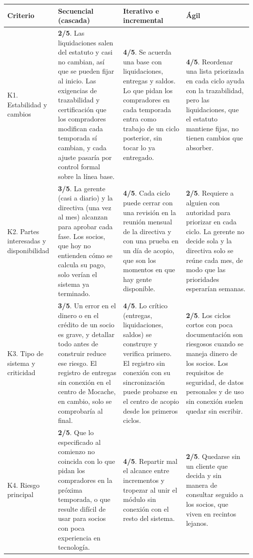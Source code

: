 \documentclass[11pt,a4paper]{article}
\begin{document}
	\small
	\begin{tabularx}{\textwidth}{|p{2.2cm}|Y|Y|Y|}
		\hline
		\textbf{Criterio} &
		\textbf{Secuencial (cascada)} &
		\textbf{Iterativo e incremental} &
		\textbf{Ágil} \\ \hline
		
		K1. Estabilidad y cambios &
		\textbf{2/5}. Las liquidaciones salen del estatuto y casi no cambian, así que se pueden fijar al inicio. Las exigencias de trazabilidad y certificación que los compradores modifican cada temporada sí cambian, y cada ajuste pasaría por control formal sobre la línea base. &
		\textbf{4/5}. Se acuerda una base con liquidaciones, entregas y saldos. Lo que pidan los compradores en cada temporada entra como trabajo de un ciclo posterior, sin tocar lo ya entregado. &
		\textbf{4/5}. Reordenar una lista priorizada en cada ciclo ayuda con la trazabilidad, pero las liquidaciones, que el estatuto mantiene fijas, no tienen cambios que absorber. \\ \hline
		
		K2. Partes interesadas y disponibilidad &
		\textbf{3/5}. La gerente (casi a diario) y la directiva (una vez al mes) alcanzan para aprobar cada fase. Los socios, que hoy no entienden cómo se calcula su pago, solo verían el sistema ya terminado. &
		\textbf{4/5}. Cada ciclo puede cerrar con una revisión en la reunión mensual de la directiva y con una prueba en un día de acopio, que son los momentos en que hay gente disponible. &
		\textbf{2/5}. Requiere a alguien con autoridad para priorizar en cada ciclo. La gerente no decide sola y la directiva solo se reúne cada mes, de modo que las prioridades esperarían semanas. \\ \hline
		
		K3. Tipo de sistema y criticidad &
		\textbf{3/5}. Un error en el dinero o en el crédito de un socio es grave, y detallar todo antes de construir reduce ese riesgo. El registro de entregas sin conexión en el centro de Mocache, en cambio, solo se comprobaría al final. &
		\textbf{4/5}. Lo crítico (entregas, liquidaciones, saldos) se construye y verifica primero. El registro sin conexión con su sincronización puede probarse en el centro de acopio desde los primeros ciclos. &
		\textbf{2/5}. Los ciclos cortos con poca documentación son riesgosos cuando se maneja dinero de los socios. Los requisitos de seguridad, de datos personales y de uso sin conexión suelen quedar sin escribir. \\ \hline
		
		K4. Riesgo principal &
		\textbf{2/5}. Que lo especificado al comienzo no coincida con lo que pidan los compradores en la próxima temporada, o que resulte difícil de usar para socios con poca experiencia en tecnología. &
		\textbf{4/5}. Repartir mal el alcance entre incrementos y tropezar al unir el módulo sin conexión con el resto del sistema. &
		\textbf{2/5}. Quedarse sin un cliente que decida y sin manera de consultar seguido a los socios, que viven en recintos lejanos. \\ \hline
		

\end{tabularx}
\end{document}
